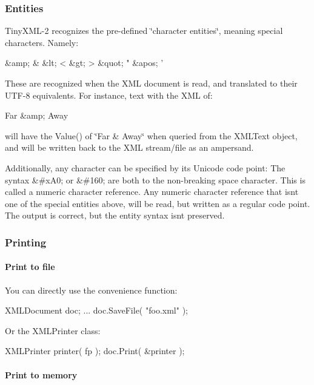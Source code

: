 \subsubsection*{Entities}

Tiny\+X\+M\+L-\/2 recognizes the pre-\/defined \char`\"{}character entities\char`\"{}, meaning special characters. Namely\+: \begin{DoxyVerb}&amp;   &
&lt;    <
&gt;    >
&quot;  "
&apos;  '
\end{DoxyVerb}


These are recognized when the X\+ML document is read, and translated to their U\+T\+F-\/8 equivalents. For instance, text with the X\+ML of\+: \begin{DoxyVerb}Far &amp; Away
\end{DoxyVerb}


will have the Value() of \char`\"{}\+Far \& Away\char`\"{} when queried from the X\+M\+L\+Text object, and will be written back to the X\+ML stream/file as an ampersand.

Additionally, any character can be specified by its Unicode code point\+: The syntax {\ttfamily \&\#x\+A0;} or {\ttfamily \&\#160;} are both to the non-\/breaking space character. This is called a \textquotesingle{}numeric character reference\textquotesingle{}. Any numeric character reference that isn\textquotesingle{}t one of the special entities above, will be read, but written as a regular code point. The output is correct, but the entity syntax isn\textquotesingle{}t preserved.

\subsubsection*{Printing}

\paragraph*{Print to file}

You can directly use the convenience function\+: \begin{DoxyVerb}XMLDocument doc;
...
doc.SaveFile( "foo.xml" );
\end{DoxyVerb}


Or the X\+M\+L\+Printer class\+: \begin{DoxyVerb}XMLPrinter printer( fp );
doc.Print( &printer );
\end{DoxyVerb}


\paragraph*{Print to memory}

